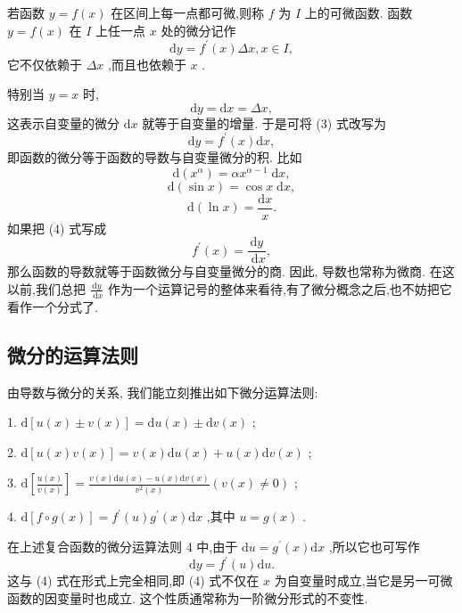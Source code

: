 若函数 \(y = f\left( x\right)\) 在区间上每一点都可微,则称 \(f\) 为 \(I\) 上的可微函数. 函数 \(y = f\left( x\right)\) 在 \(I\) 上任一点 \(x\) 处的微分记作
\[
\mathrm{d}y = {f}^{\prime }\left( x\right) {\Delta x},x \in  I, \tag{3}
\]
它不仅依赖于 \({\Delta x}\) ,而且也依赖于 \(x\) .

特别当 \(y = x\) 时,
\[
\mathrm{d}y = \mathrm{d}x = {\Delta x},
\]
这表示自变量的微分 \(\mathrm{d}x\) 就等于自变量的增量. 于是可将 (3) 式改写为
\[
\mathrm{d}y = {f}^{\prime }\left( x\right) \mathrm{d}x, \tag{4}
\]
即函数的微分等于函数的导数与自变量微分的积. 比如
\[
\mathrm{d}\left( {x}^{\alpha }\right)  = \alpha {x}^{\alpha  - 1}\mathrm{\;d}x,
\]
\[
\mathrm{d}\left( {\sin x}\right)  = \cos x\mathrm{\;d}x,
\]
\[
\mathrm{d}\left( {\ln x}\right)  = \frac{\mathrm{d}x}{x}.
\]
如果把 (4) 式写成
\[
{f}^{\prime }\left( x\right)  = \frac{\mathrm{d}y}{\mathrm{\;d}x},
\]
那么函数的导数就等于函数微分与自变量微分的商. 因此, 导数也常称为微商. 在这以前,我们总把 \(\frac{\mathrm{d}y}{\mathrm{\;d}x}\) 作为一个运算记号的整体来看待,有了微分概念之后,也不妨把它看作一个分式了.

\subsection{微分的运算法则}

由导数与微分的关系, 我们能立刻推出如下微分运算法则:

1. \(\mathrm{d}\left\lbrack  {u\left( x\right)  \pm  v\left( x\right) }\right\rbrack   = \mathrm{d}u\left( x\right)  \pm  \mathrm{d}v\left( x\right)\) ;

2. \(\mathrm{d}\left\lbrack  {u\left( x\right) v\left( x\right) }\right\rbrack   = v\left( x\right) \mathrm{d}u\left( x\right)  + u\left( x\right) \mathrm{d}v\left( x\right)\) ;

3. \(\mathrm{d}\left\lbrack  \frac{u\left( x\right) }{v\left( x\right) }\right\rbrack   = \frac{v\left( x\right) \mathrm{d}u\left( x\right)  - u\left( x\right) \mathrm{d}v\left( x\right) }{{v}^{2}\left( x\right) }\left( {v\left( x\right)  \neq  0}\right)\) ;

4. \(\mathrm{d}\left\lbrack  {f \circ  g\left( x\right) }\right\rbrack   = {f}^{\prime }\left( u\right) {g}^{\prime }\left( x\right) \mathrm{d}x\) ,其中 \(u = g\left( x\right)\) .

在上述复合函数的微分运算法则 4 中,由于 \(\mathrm{d}u = {g}^{\prime }\left( x\right) \mathrm{d}x\) ,所以它也可写作
\[
\mathrm{d}y = {f}^{\prime }\left( u\right) \mathrm{d}u.
\]
这与 (4) 式在形式上完全相同,即 (4) 式不仅在 \(x\) 为自变量时成立,当它是另一可微函数的因变量时也成立. 这个性质通常称为一阶微分形式的不变性.

